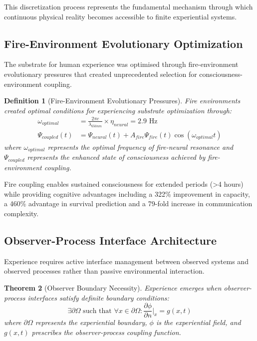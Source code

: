 \documentclass{article}
\newtheorem{theorem}{Theorem}[section]
\newtheorem{definition}[theorem]{Definition}
\begin{document}
This discretization process represents the fundamental mechanism through which continuous physical reality becomes accessible to finite experiential systems.

\subsection{Fire-Environment Evolutionary Optimization}

The substrate for human experience was optimised through fire-environment evolutionary pressures that created unprecedented selection for consciousness-environment coupling.

\begin{definition}[Fire-Environment Evolutionary Pressures]
Fire environments created optimal conditions for experiencing substrate optimization through:
\begin{align}
\omega_{optimal} &= \frac{2\pi c}{\lambda_{650nm}} \times \eta_{neural} = 2.9 \text{ Hz} \\
\Psi_{coupled}(t) &= \Psi_{neural}(t) + A_{fire}\Psi_{fire}(t)\cos(\omega_{optimal}t)
\end{align}
where $\omega_{optimal}$ represents the optimal frequency of fire-neural resonance and $\Psi_{coupled}$ represents the enhanced state of consciousness achieved by fire-environment coupling.
\end{definition}

Fire coupling enables sustained consciousness for extended periods (>4 hours) while providing cognitive advantages including a 322\% improvement in capacity, a 460\% advantage in survival prediction and a 79-fold increase in communication complexity.

\subsection{Observer-Process Interface Architecture}

Experience requires active interface management between observed systems and observed processes rather than passive environmental interaction.

\begin{theorem}[Observer Boundary Necessity]
Experience emerges when observer-process interfaces satisfy definite boundary conditions:
$$\exists \partial \Omega \text{ such that } \forall x \in \partial \Omega : \frac{\partial \phi}{\partial n}\bigg|_x = g(x,t)$$
where $\partial \Omega$ represents the experiential boundary, $\phi$ is the experiential field, and $g(x,t)$ prescribes the observer-process coupling function.
\end{theorem}
\end{document}
